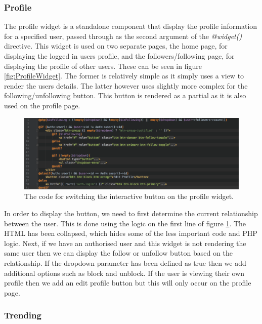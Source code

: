 \subsubsection{Profile}
The profile widget is a standalone component that display the profile information for a specified user, passed through as the second argument of the \textit{@widget()} directive. This widget is used on two separate pages, the home page, for displaying the logged in users profile, and the followers/following page, for displaying the profile of other users. These can be seen in figure \ref{fig:ProfileWidget}. The former is relatively simple as it simply uses a view to render the users details. The latter however uses slightly more complex for the following/unfollowing button. This button is rendered as a partial as it is also used on the profile page.

\begin{figure}[H]
	\centering
	\includegraphics[width=\textwidth]{Images/Implementation/UI/Widgets/Profile_Follow}
	\caption{The code for switching the interactive button on the profile widget.}
	\label{fig:Profile_Follow}
\end{figure}

In order to display the button, we need to first determine the current relationship between the user. This is done using the logic on the first line of figure \ref{fig:Profile_Follow}. The HTML has been collapsed, which hides some of the less important code and PHP logic. Next, if we have an authorised user and this widget is not rendering the same user then we can display the follow or unfollow button based on the relationship. If the dropdown parameter has been defined as true then we add additional options such as block and unblock. If the user is viewing their own profile then we add an edit profile button but this will only occur on the profile page.

\subsubsection{Trending}
